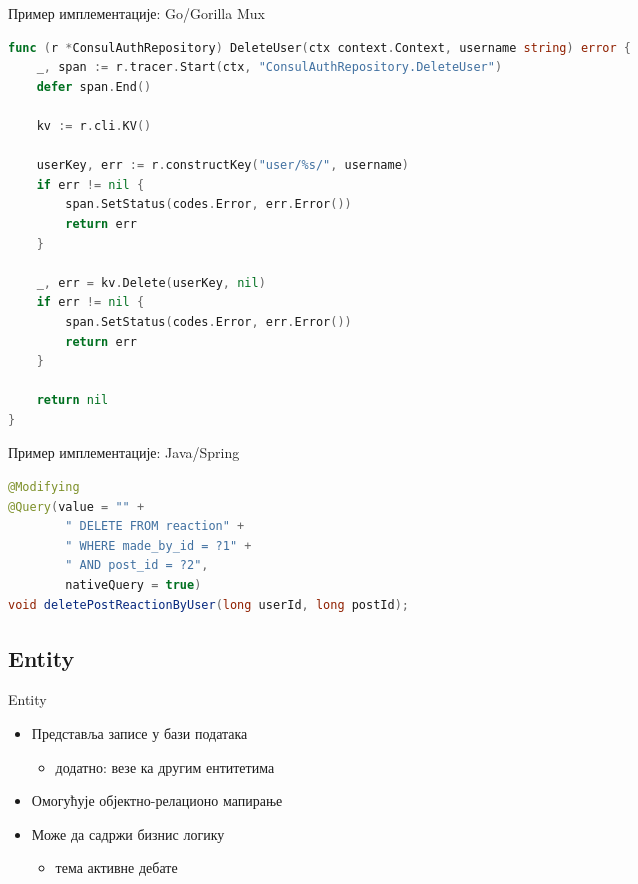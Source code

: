 \documentclass{beamer}
\begin{document}
    \begin{frame}[fragile]{Пример имплементације: Go/Gorilla Mux}
        \begin{adjustbox}{width=\textwidth,height=\textheight,keepaspectratio}
            \begin{lstlisting}[language=go]
func (r *ConsulAuthRepository) DeleteUser(ctx context.Context, username string) error {
    _, span := r.tracer.Start(ctx, "ConsulAuthRepository.DeleteUser")
    defer span.End()

    kv := r.cli.KV()

    userKey, err := r.constructKey("user/%s/", username)
    if err != nil {
        span.SetStatus(codes.Error, err.Error())
        return err
    }

    _, err = kv.Delete(userKey, nil)
    if err != nil {
        span.SetStatus(codes.Error, err.Error())
        return err
    }

    return nil
}
            \end{lstlisting}
        \end{adjustbox}
    \end{frame}
    
    \begin{frame}[fragile]{Пример имплементације: Java/Spring}
        \begin{adjustbox}{width=\textwidth,height=\textheight,keepaspectratio}
            \begin{lstlisting}[language=java]
@Modifying
@Query(value = "" +
        " DELETE FROM reaction" +
        " WHERE made_by_id = ?1" +
        " AND post_id = ?2",
        nativeQuery = true)
void deletePostReactionByUser(long userId, long postId);
            \end{lstlisting}
        \end{adjustbox}
    \end{frame}
    
    \subsection{Entity}
    
    \begin{frame}{Entity}
        \begin{itemize}
            \item Представља записе у бази података
            \begin{itemize}
                \item додатно: везе ка другим ентитетима
            \end{itemize}
            \item Омогућује објектно-релационо мапирање
            \item Може да садржи бизнис логику
            \begin{itemize}
                \item тема активне дебате
            \end{itemize}
        \end{itemize}
    \end{frame}
    
\end{document}

